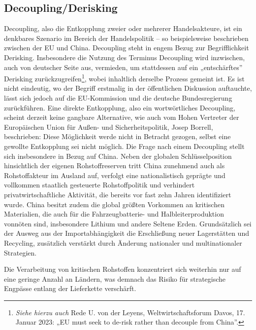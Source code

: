 \documentclass[12pt,a4paper,oneside]{book} %
\begin{document}
{	\subsection{Decoupling/Derisking}
	Decoupling, also die Entkopplung zweier oder mehrerer Handelsakteure, ist ein denkbares Szenario im Bereich der Handelspolitik – so beispielsweise beschrieben zwischen der EU und China.\autocite{fuest_geopolitische_2022} Decoupling steht in engem Bezug zur Begrifflichkeit Derisking. Insbesondere die Nutzung des Terminus Decoupling wird inzwischen, auch von deutscher Seite aus, vermieden, um stattdessen auf ein „entschärftes” Derisking zurückzugreifen\footnote{\textit{Siehe hierzu auch} Rede U. von der Leyens, Weltwirtschaftsforum Davos, 17. Januar 2023: „EU must seek to de-risk rather than decouple from China”.}, wobei inhaltlich derselbe Prozess gemeint ist. Es ist nicht eindeutig, wo der Begriff erstmalig in der öffentlichen Diskussion auftauchte, lässt sich jedoch auf die EU-Kommission und die deutsche Bundesregierung zurückführen.\autocite{kormbaki_wettstreit_2023} Eine direkte Entkopplung, also ein wortwörtliches Decoupling, scheint derzeit keine gangbare Alternative, wie auch vom Hohen Vertreter der Europäischen Union für Außen- und Sicherheitspolitik, Josep Borrell, beschrieben: Diese Möglichkeit werde nicht in Betracht gezogen, selbst eine gewollte Entkopplung sei nicht möglich.\autocite{europaischer_auswartiger_dienst_foreign_2023} Die Frage nach einem Decoupling stellt sich insbesondere in Bezug auf China. Neben der globalen Schlüsselposition hinsichtlich der eigenen Rohstoffreserven tritt China zunehmend auch als Rohstoffakteur im Ausland auf, verfolgt eine nationalistisch geprägte und vollkommen staatlich gesteuerte Rohstoffpolitik und verhindert privatwirtschaftliche Aktivität, die bereits vor fast zehn Jahren identifiziert wurde.\autocite{sausmikat_chinas_2015} China besitzt zudem die global größten Vorkommen an kritischen Materialien, die auch für die Fahrzeugbatterie- und Halbleiterproduktion vonnöten sind, insbesondere Lithium und andere Seltene Erden. Grundsätzlich sei der Ausweg aus der Importabhängigkeit die Erschließung neuer Lagerstätten und Recycling, zusätzlich verstärkt durch Änderung nationaler und multinationaler Strategien.\autocite{wissenschaftliche_dienste_des_deutschen_bundestages_seltene_2022}
	
	Die Verarbeitung von kritischen Rohstoffen konzentriert sich weiterhin nur auf eine geringe Anzahl an Ländern, was demnach das Risiko für strategische Engpässe entlang der Lieferkette verschärft. 
	
}
\end{document}

